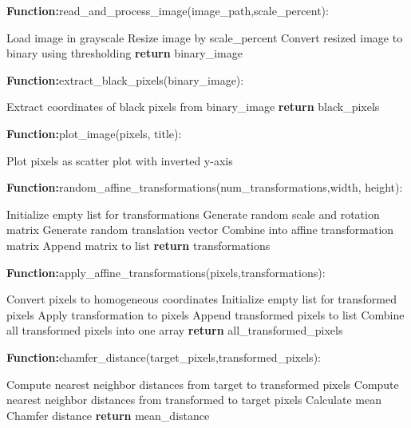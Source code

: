 \documentclass[a4paper,11pt, titlepage]{article}
\theoremstyle{definition}
\theoremstyle{plain}
\theoremstyle{remark}
\theoremstyle{definition}
\begin{document}
\begin{algorithm}[1]

\textbf{Function:}read\_and\_process\_image(image\_path,scale\_percent):
\begin{algorithmic}[1]
\STATE Load image in grayscale
\STATE Resize image by scale\_percent
\STATE Convert resized image to binary using thresholding
\STATE \textbf{return} binary\_image
\end{algorithmic}

\textbf{Function:}extract\_black\_pixels(binary\_image):
\begin{algorithmic}[1]
\STATE Extract coordinates of black pixels from binary\_image
\STATE \textbf{return} black\_pixels
\end{algorithmic}

\textbf{Function:}plot\_image(pixels, title):
\begin{algorithmic}[1]
\STATE Plot pixels as scatter plot with inverted y-axis
\end{algorithmic}

\textbf{Function:}random\_affine\_transformations(num\_transformations,width, height):
\begin{algorithmic}[1]
\STATE Initialize empty list for transformations
    \STATE Generate random scale and rotation matrix
    \STATE Generate random translation vector
    \STATE Combine into affine transformation matrix
    \STATE Append matrix to list
\ENDFOR
\STATE \textbf{return} transformations
\end{algorithmic}

\textbf{Function:}apply\_affine\_transformations(pixels,transformations):
\begin{algorithmic}[1]
\STATE Convert pixels to homogeneous coordinates
\STATE Initialize empty list for transformed pixels
    \STATE Apply transformation to pixels
    \STATE Append transformed pixels to list
\ENDFOR
\STATE Combine all transformed pixels into one array
\STATE \textbf{return} all\_transformed\_pixels
\end{algorithmic}

\textbf{Function:}chamfer\_distance(target\_pixels,transformed\_pixels):
\begin{algorithmic}[1]
\STATE Compute nearest neighbor distances from target to transformed pixels
\STATE Compute nearest neighbor distances from transformed to target pixels
\STATE Calculate mean Chamfer distance
\STATE \textbf{return} mean\_distance
\end{algorithmic}
\end{algorithm}
\end{document}
